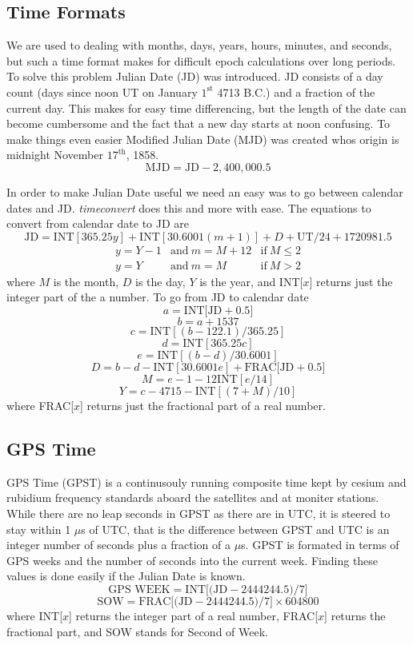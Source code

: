 \begin{bibunit}
\subsection{Time Formats}
We are used to dealing with months, days, years, hours, minutes, and seconds, but such a time format makes for difficult epoch calculations over long periods. To solve this problem Julian Date (JD) was introduced. JD consists of a day count (days since noon UT on January $1^{\mbox{st}}$ 4713 B.C.) and a fraction of the current day. This makes for easy time differencing, but the length of the date can become cumbersome and the fact that a new day starts at noon confusing. To make things even easier Modified Julian Date (MJD) was created whos origin is midnight November $17^{\mbox{th}}$, 1858.
\[ \mbox{MJD}=\mbox{JD}-2,400,000.5 \]

In order to make Julian Date useful we need an easy was to go between calendar dates and JD. \emph{timeconvert} does this and more with ease. The equations to convert from calendar date to JD are
\[ \mbox{JD}=\mbox{INT}[365.25y]+\mbox{INT}[30.6001(m+1)]+D+\mbox{UT}/24+1720981.5\]
\[ \begin{array}{lll}
y=Y-1 & \mbox{and}~m=M+12 & \mbox{if}~M \leq2 \\
y=Y & \mbox{and}~m=M & \mbox{if}~M > 2
\end{array} \]
where $M$ is the month, $D$ is the day, $Y$ is the year, and INT[$x$] returns just the integer part of the a number. To go from JD to calendar date
\[ a=\mbox{INT[JD}+0.5] \]
\[ b=a+1537 \]
\[ c=\mbox{INT}[(b-122.1)/365.25] \]
\[ d=\mbox{INT}[365.25c] \]
\[ e=\mbox{INT}[(b-d)/30.6001] \]
\[ D=b-d-\mbox{INT}[30.6001e]+\mbox{FRAC[JD}+0.5] \]
\[ M=e-1-12\mbox{INT}[e/14] \]
\[ Y=c-4715-\mbox{INT}[(7+M)/10] \]
where FRAC[$x$] returns just the fractional part of a real number.
\subsection{GPS Time}
GPS Time (GPST) is a continusouly running composite time kept by cesium and rubidium frequency standards aboard the satellites and at moniter stations. While there are no leap seconds in GPST as there are in UTC, it is steered to stay within 1 $\mu$s of UTC, that is the difference between GPST and UTC is an integer number of seconds plus a fraction of a $\mu$s. GPST is formated in terms of GPS weeks and the number of seconds into the current week. Finding these values is done easily if the Julian Date is known.
\[ \mbox{GPS WEEK}=\mbox{INT[(JD}-2444244.5)/7] \]
\[ \mbox{SOW}=\mbox{FRAC[(JD}-2444244.5)/7]\times 604800 \]
where INT[$x$] returns the integer part of a real number, FRAC[$x$] returns the fractional part, and SOW stands for Second of Week.


\end{bibunit}
